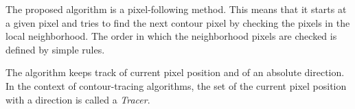 \documentclass[thesis.tex]{subfiles}
\begin{document}
The proposed algorithm is a pixel-following method. This means that it starts at a given pixel and tries to find the next contour pixel by checking the pixels in the local neighborhood. The order in which the neighborhood pixels are checked is defined by simple rules. 

The algorithm keeps track of current pixel position and of an absolute direction. In the context of contour-tracing algorithms, the set of the current pixel position with a direction is called a \textit{Tracer}.

\newcommand{\figcontourwidth}{3.5}
\newcommand{\figcontourfirstOffset}{0}
\newcommand{\figcontousecondOffset}{4.5}
\newcommand{\figcontouthirdOffset}{9}
\newcommand{\figcontoufourthOffset}{13.5}
\newcommand{\figcontousecondRowYOffset}{4.5}	

\newcommand\ContourPhaseOneCaseOne{
\begin{tikzpicture}
	\filldraw [fill=gray!50, draw=black, very thick] (\figcontourfirstOffset,0) rectangle (\figcontourfirstOffset + \figcontourwidth/2, \figcontourwidth/2); %
	\filldraw [fill=gray!50, draw=black, very thick] (\figcontourfirstOffset, \figcontourwidth/2) rectangle (\figcontourfirstOffset + \figcontourwidth/2, \figcontourwidth); %
	\filldraw [fill=gray!50, draw=black, very thick] (\figcontourfirstOffset + \figcontourwidth/2, \figcontourwidth/2) rectangle (\figcontourfirstOffset + \figcontourwidth, \figcontourwidth); %
	\draw [draw=black, very thick] (\figcontourfirstOffset + \figcontourwidth/2,0) rectangle (\figcontourfirstOffset + \figcontourwidth, \figcontourwidth/2); %
	
	\draw[draw=black, line width=3.0pt, {*[fill=darkgreen!60]}-Latex] (\figcontourfirstOffset + \figcontourwidth/2 + \figcontourwidth/4, \figcontourwidth/2 + \figcontourwidth/12) -- (\figcontourfirstOffset + \figcontourwidth - \figcontourwidth/4, \figcontourwidth - \figcontourwidth/16);
\draw[draw=black, line width=3.0pt, -Latex](\figcontourfirstOffset + \figcontourwidth/2 - \figcontourwidth/12,  \figcontourwidth/2 + \figcontourwidth/4) -- (\figcontourfirstOffset + \figcontourwidth/16, \figcontourwidth/2 + \figcontourwidth/4);
\draw[draw=black, line width=3.0pt, -Latex] (\figcontourfirstOffset + \figcontourwidth/2 - \figcontourwidth/4, \figcontourwidth/2 - \figcontourwidth/12) -- (\figcontourfirstOffset + \figcontourwidth/4,0 + \figcontourwidth/16);

\draw[draw=black, line width=1.5pt, dashed] (\figcontourfirstOffset + \figcontourwidth - \figcontourwidth/4, \figcontourwidth - \figcontourwidth/16) -- (\figcontourfirstOffset + \figcontourwidth/2 - \figcontourwidth/12,  \figcontourwidth/2 + \figcontourwidth/4);
\draw[draw=black, line width=1.5pt, dashed] (\figcontourfirstOffset + \figcontourwidth/16, \figcontourwidth/2 + \figcontourwidth/4) -- (\figcontourfirstOffset + \figcontourwidth/2 - \figcontourwidth/4, \figcontourwidth/2 - \figcontourwidth/12);
\end{tikzpicture}
}
\end{document}
